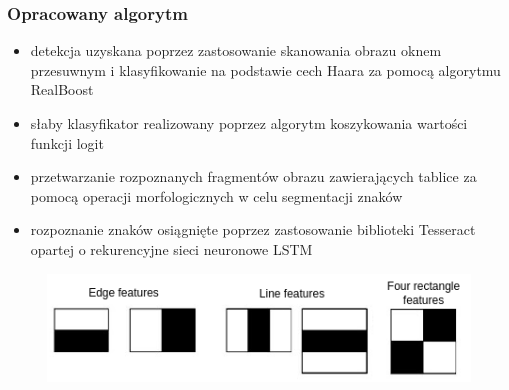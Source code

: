 \documentclass{beamer}
\begin{document}
    \begin{frame}
        \frametitle{Opracowany algorytm}
        \begin{itemize}
            \item detekcja uzyskana poprzez zastosowanie skanowania obrazu oknem przesuwnym i klasyfikowanie na podstawie cech Haara za pomocą algorytmu RealBoost
            \item słaby klasyfikator realizowany poprzez algorytm koszykowania wartości funkcji logit
            \item przetwarzanie rozpoznanych fragmentów obrazu zawierających tablice za pomocą operacji morfologicznych w celu segmentacji znaków
            \item rozpoznanie znaków osiągnięte poprzez zastosowanie biblioteki Tesseract opartej o rekurencyjne sieci neuronowe LSTM
        \end{itemize}

        \begin{figure}
            \includegraphics[scale=0.3]{../WIZUT-Dyplom-styl/Pictures/haar_feats}
        \end{figure}
    \end{frame}
\end{document}
